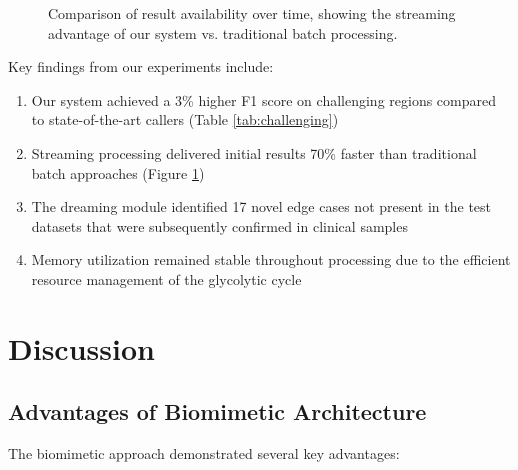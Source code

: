 \documentclass[11pt,a4paper,twocolumn]{article}
\begin{document}
\begin{figure}[h]
\centering
{}
\caption{Comparison of result availability over time, showing the streaming advantage of our system vs. traditional batch processing.}
\label{fig:streaming_advantage}
\end{figure}

Key findings from our experiments include:

\begin{enumerate}
    \item Our system achieved a 3\% higher F1 score on challenging regions compared to state-of-the-art callers (Table \ref{tab:challenging})
    \item Streaming processing delivered initial results 70\% faster than traditional batch approaches (Figure \ref{fig:streaming_advantage})
    \item The dreaming module identified 17 novel edge cases not present in the test datasets that were subsequently confirmed in clinical samples
    \item Memory utilization remained stable throughout processing due to the efficient resource management of the glycolytic cycle
\end{enumerate}

\section{Discussion}

\subsection{Advantages of Biomimetic Architecture}
The biomimetic approach demonstrated several key advantages:
\end{document}
